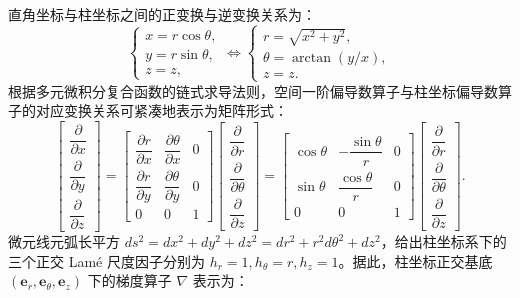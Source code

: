 \documentclass[12pt,a4paper]{ctexart}
\begin{document}
直角坐标与柱坐标之间的正变换与逆变换关系为：
\begin{equation}
\begin{cases}
x = r\cos\theta,\\
y = r\sin\theta,\\
z = z,
\end{cases}
\iff
\begin{cases}
r = \sqrt{x^2+y^2},\\[4pt]
\theta = \arctan(y/x),\\[4pt]
z = z.
\end{cases}
\end{equation}
根据多元微积分复合函数的链式求导法则，空间一阶偏导数算子与柱坐标偏导数算子的对应变换关系可紧凑地表示为矩阵形式：
\begin{equation}
\begin{bmatrix}
\dfrac{\partial}{\partial x} \\[10pt]
\dfrac{\partial}{\partial y} \\[10pt]
\dfrac{\partial}{\partial z}
\end{bmatrix}
=
\begin{bmatrix}
\dfrac{\partial r}{\partial x} & \dfrac{\partial\theta}{\partial x} & 0 \\[10pt]
\dfrac{\partial r}{\partial y} & \dfrac{\partial\theta}{\partial y} & 0 \\[10pt]
0 & 0 & 1
\end{bmatrix}
\begin{bmatrix}
\dfrac{\partial}{\partial r} \\[10pt]
\dfrac{\partial}{\partial\theta} \\[10pt]
\dfrac{\partial}{\partial z}
\end{bmatrix}
=
\begin{bmatrix}
\cos\theta & -\dfrac{\sin\theta}{r} & 0 \\[10pt]
\sin\theta & \dfrac{\cos\theta}{r} & 0 \\[10pt]
0 & 0 & 1
\end{bmatrix}
\begin{bmatrix}
\dfrac{\partial}{\partial r} \\[10pt]
\dfrac{\partial}{\partial\theta} \\[10pt]
\dfrac{\partial}{\partial z}
\end{bmatrix}.\label{eq:jacobi_transform}
\end{equation}
微元线元弧长平方 $ds^2=dx^2+dy^2+dz^2=dr^2+r^2d\theta^2+dz^2$，给出柱坐标系下的三个正交 Lamé 尺度因子分别为 $h_r=1, h_\theta=r, h_z=1$。据此，柱坐标正交基底 $(\mathbf{e}_r,\mathbf{e}_\theta,\mathbf{e}_z)$ 下的梯度算子 $\nabla$ 表示为：
\end{document}
